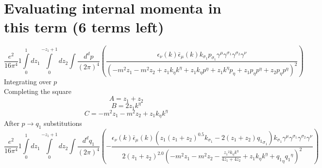\section*{Evaluating internal momenta in this term (6 terms left)}
\begin{dmath}\frac{e^{2}}{16 \pi^{4}}1\int\limits_{ 0 }^{ 1 } d{ z_{ 1 } }\int\limits_{ 0 }^{ - { z_{ 1 } } + 1 } d{ z_{ 2 } }\int\frac{d^d p }{ (2\pi)^4 }\left(\frac{\epsilon_{ \nu }({ k }) \bar{\epsilon}_{ \mu }({ k }) { { k }_{ \sigma_1 } } { { p }_{ \sigma_1 } } { \gamma^{ \mu } } { \gamma^{ \sigma_1 } } { \gamma^{ \sigma_2 } } { \gamma^{ \nu } }}{\left(- m^{2} { z_{ 1 } } - m^{2} { z_{ 2 } } + { z_{ 1 } } { { k }_{ \eta } } { { k }^{ \eta } } + { z_{ 1 } } { { k }_{ \eta } } { { p }^{ \eta } } + { z_{ 1 } } { { k }^{ \eta } } { { p }_{ \eta } } + { z_{ 1 } } { { p }_{ \eta } } { { p }^{ \eta } } + { z_{ 2 } } { { p }_{ \eta } } { { p }^{ \eta } }\right)^{2}}\right)\end{dmath}
Integrating over $p$\\
Completing the square\
\begin{dmath}A = { z_{ 1 } } + { z_{ 2 } }\end{dmath}
\begin{dmath}B = 2 { z_{ 1 } } { { k }^{ \eta } }\end{dmath}
\begin{dmath}C = - m^{2} { z_{ 1 } } - m^{2} { z_{ 2 } } + { z_{ 1 } } { { k }_{ \eta } } { { k }^{ \eta } }\end{dmath}
After $p \to q_1$ substitutions
\begin{dmath}\frac{e^{2}}{16 \pi^{4}}1\int\limits_{ 0 }^{ 1 } d{ z_{ 1 } }\int\limits_{ 0 }^{ - { z_{ 1 } } + 1 } d{ z_{ 2 } }\int\frac{d^d q_1 }{ (2\pi)^4 }\left(- \frac{\epsilon_{ \nu }({ k }) \bar{\epsilon}_{ \mu }({ k }) \left({ z_{ 1 } } \left({ z_{ 1 } } + { z_{ 2 } }\right)^{0.5} { { k }_{ \sigma_1 } } - 2 \left({ z_{ 1 } } + { z_{ 2 } }\right) { { q_1 }_{ \sigma_1 } }\right) { { k }_{ \sigma_1 } } { \gamma^{ \mu } } { \gamma^{ \sigma_1 } } { \gamma^{ \sigma_2 } } { \gamma^{ \nu } }}{2 \left({ z_{ 1 } } + { z_{ 2 } }\right)^{2.0} \left(- m^{2} { z_{ 1 } } - m^{2} { z_{ 2 } } - \frac{{ z_{ 1 } }^{2} { { k }_{ \eta } } { { k }^{ \eta } }}{4 { z_{ 1 } } + 4 { z_{ 2 } }} + { z_{ 1 } } { { k }_{ \eta } } { { k }^{ \eta } } + { { q_1 }_{ \eta } } { { q_1 }^{ \eta } }\right)^{2}}\right)\end{dmath}
